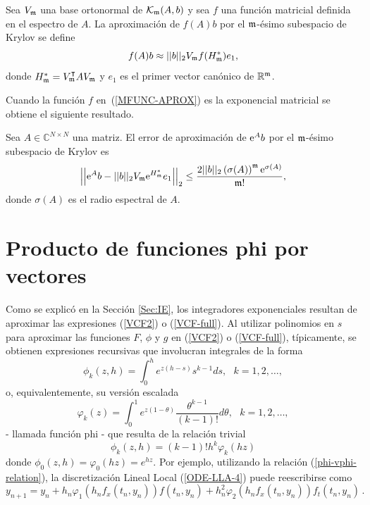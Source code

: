 \begin{definition}
    \cite{Saad92} Sea $V_{\mathfrak{m}}$ una base ortonormal de $\mathcal{K}_{\mathfrak{m}}(A,b)$ y sea $f$ una función matricial definida
    en el espectro de $A$. La aproximación de $f(A)b$ por el  $\mathfrak{m}$-ésimo subespacio de Krylov se define
    \begin{equation}
        f(A)b\approx ||b||_2 V_{\mathfrak{m}} f(H^*_{\mathfrak{m}})e_1, \label{MFUNC-APROX}
    \end{equation}
    donde $H_{\mathfrak{m}}^*=V_{\mathfrak{m}}^{\intercal}AV_{\mathfrak{m}}$ y $e_1$ es el primer vector canónico de $\mathbb{R}^{\mathfrak{m}}$.
\end{definition}
Cuando la función $f$ en~(\ref{MFUNC-APROX}) es la exponencial matricial se obtiene el siguiente resultado.
\begin{theorem}\label{exp-bound}
	\cite{Saad92} Sea $A\in\mathbb{C}^{N\times N}$ una matriz. El error de aproximación de $\mathrm{e}^{A}b$ por el $\mathfrak{m}$-ésimo subespacio
	de Krylov es
	\begin{equation*}
	\left\lvert\left\lvert \mathrm{e}^{A}b - \lvert\lvert b \rvert\rvert_2 V_{\mathfrak{m}}\mathrm{e}^{H^*_{\mathfrak{m}}}e_1 \right\rvert\right\rvert_2 
	\leq \frac{2\vert\lvert b \rvert\rvert_2 \left( \sigma(A) \right)^{\mathfrak{m}}\mathrm{e}^{\sigma(A)}}{\mathfrak{m}!},
	\end{equation*}
	donde $\sigma(A)$ es el radio espectral de $A$.
\end{theorem}

\section{Producto de funciones phi por vectores}\label{section:phi-times-vector}

Como se explicó en la Sección \ref{Sec:IE}, los integradores exponenciales resultan de aproximar las expresiones (\ref{VCF2}) o (\ref{VCF-full}). Al utilizar polinomios en $s$ para aproximar las funciones $F$, $\phi$ y $g$ en (\ref{VCF2}) o (\ref{VCF-full}), típicamente, se obtienen expresiones recursivas que involucran integrales de la forma
\begin{equation*}
\phi _{k}(z,h)=\int_{0}^{h}e^{z(h-s)}s^{k-1}ds,\text{ \ \ \ \ \ \ \ }%
k=1,2,\ldots ,
\end{equation*}%
o, equivalentemente, su versión escalada
\begin{equation*}
\varphi _{k}(z)=\int_{0}^{1}e^{z(1-\theta )}\frac{\theta ^{k-1}}{(k-1)!}%
d\theta ,\text{ \ \ \ \ \ \ \ }k=1,2,\ldots ,
\end{equation*}%
- llamada función phi - que resulta de la relación trivial 
\begin{equation}
	\phi _{k}(z,h)=(k-1)!h^{k}\varphi_{k}(hz) \label{phi-vphi-relation}
\end{equation} 
donde $\phi _{0}(z,h)=\varphi _{0}(hz)=e^{hz}$. Por ejemplo, utilizando la relación (\ref{phi-vphi-relation}), la discretización Lineal Local (\ref{ODE-LLA-4})
puede reescribirse como
\begin{equation}
		y_{n+1}=y_{n}+h_n\varphi_1(h_nf_x(t_n,y_n))f(t_n,y_n) + h_n^2\varphi_2(h_nf_x(t_n,y_n))f_t(t_n,y_n)  \, . 
\end{equation}


